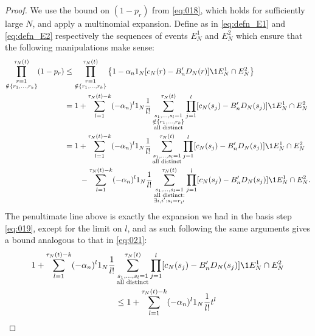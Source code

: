 \begin{proof}
We use the bound on $(1-p_r)$ from \eqref{eq:018}, which holds for sufficiently large $N$, and apply a multinomial expansion. Define as in \eqref{eq:defn_E1} and \eqref{eq:defn_E2} respectively the sequences of events $E_N^1$ and $E_N^2$ which 
ensure that the following manipulations make sense:
\begin{align}
\prod_{\substack{r=1 \\ \notin \{r_1,\dots,r_k\} }}^{\tau_N(t)} (1-p_r)
&\leq \prod_{\substack{r=1 \\ \notin \{r_1,\dots,r_k\} }}^{\tau_N(t)} 
        \left\{ 1 - \alpha_n  \ON [ c_N(r) - B_n^\prime D_N(r) ] 
        \1{E_N^1 \cap E_N^2} \right\} \notag\\
&= 1 + \sum_{l=1}^{\tau_N(t) -k}
        (-\alpha_n)^l \ON \frac{1}{l!}
        \sum_{\substack{s_1, \dots, s_l =1 \\ \notin \{r_1,\dots,r_k\} 
        \\ \text{all distinct} }}^{\tau_N(t)}
        \prod_{j=1}^l [ c_N(s_j) - B_n^\prime D_N(s_j) ]
        \1{E_N^1 \cap E_N^2} \notag\\
&= 1 + \sum_{l=1}^{\tau_N(t) -k}
        (-\alpha_n)^l \ON \frac{1}{l!}
        \sum_{\substack{ s_1, \dots, s_l =1 \\ \text{all distinct} }}^{\tau_N(t)}
        \prod_{j=1}^l [ c_N(s_j) - B_n^\prime D_N(s_j) ] \1{E_N^1 \cap E_N^2} \notag\\
    &\qquad- \sum_{l=1}^{\tau_N(t) -k}
        (-\alpha_n)^l \ON \frac{1}{l!}
        \sum_{\substack{s_1, \dots, s_l =1 \\ \text{all distinct}: 
        \\ \exists i,i^\prime : s_i=r_{i^\prime} }}^{\tau_N(t)} 
        \prod_{j=1}^l [ c_N(s_j) - B_n^\prime D_N(s_j) ]
        \1{E_N^1 \cap E_N^2} . \label{eq:031}
\end{align}
The penultimate line above is exactly the expansion we had in the basis step \eqref{eq:019}, except for the limit on $l$, and as such following the same arguments gives a bound analogous to that in \eqref{eq:021}:
\begin{align*}
1 + \sum_{l=1}^{\tau_N(t) -k}
        (-\alpha_n)^l \ON \frac{1}{l!}
        &\sum_{\substack{ s_1, \dots, s_l =1 \\ \text{all distinct} }}^{\tau_N(t)}
        \prod_{j=1}^l [ c_N(s_j) - B_n^\prime D_N(s_j) ] \1{E_N^1 \cap E_N^2} \\
&\leq 1+ \sum_{l=1}^{\tau_N(t) -k} (-\alpha_n)^l \ON \frac{1}{l!} t^l

\end{align*}
\end{proof}

